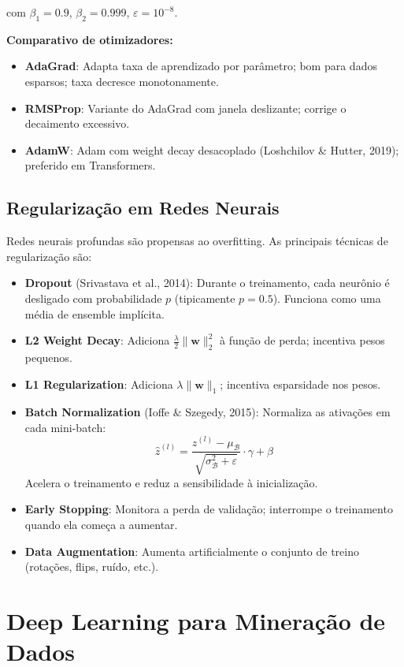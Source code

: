 \documentclass[12pt,a4paper]{article}
\begin{document}
com $\beta_1 = 0.9$, $\beta_2 = 0.999$, $\varepsilon = 10^{-8}$.

\textbf{Comparativo de otimizadores:}
\begin{itemize}
  \item \textbf{AdaGrad}: Adapta taxa de aprendizado por parâmetro; bom para dados esparsos; taxa decresce monotonamente.
  \item \textbf{RMSProp}: Variante do AdaGrad com janela deslizante; corrige o decaimento excessivo.
  \item \textbf{AdamW}: Adam com weight decay desacoplado (Loshchilov \& Hutter, 2019); preferido em Transformers.
\end{itemize}

\subsection{Regularização em Redes Neurais}

Redes neurais profundas são propensas ao overfitting. As principais técnicas de regularização são:

\begin{itemize}
  \item \textbf{Dropout} (Srivastava et al., 2014): Durante o treinamento, cada neurônio é desligado com probabilidade $p$ (tipicamente $p = 0.5$). Funciona como uma média de ensemble implícita.
  \item \textbf{L2 Weight Decay}: Adiciona $\frac{\lambda}{2}\|\mathbf{w}\|_2^2$ à função de perda; incentiva pesos pequenos.
  \item \textbf{L1 Regularization}: Adiciona $\lambda\|\mathbf{w}\|_1$; incentiva esparsidade nos pesos.
  \item \textbf{Batch Normalization} (Ioffe \& Szegedy, 2015): Normaliza as ativações em cada mini-batch:
  \[
    \hat{z}^{(l)} = \frac{z^{(l)} - \mu_\mathcal{B}}{\sqrt{\sigma_\mathcal{B}^2 + \varepsilon}} \cdot \gamma + \beta
  \]
  Acelera o treinamento e reduz a sensibilidade à inicialização.
  \item \textbf{Early Stopping}: Monitora a perda de validação; interrompe o treinamento quando ela começa a aumentar.
  \item \textbf{Data Augmentation}: Aumenta artificialmente o conjunto de treino (rotações, flips, ruído, etc.).
\end{itemize}

\section{Deep Learning para Mineração de Dados}
\end{document}
